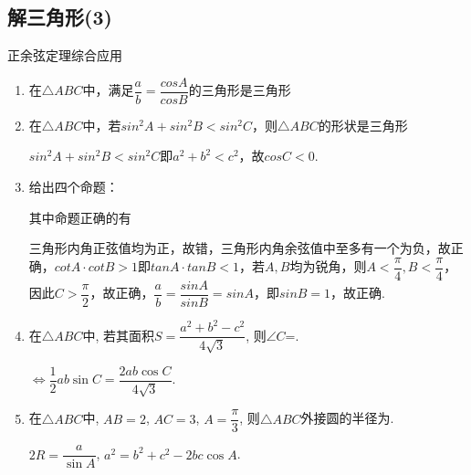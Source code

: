 \subsection{解三角形(3)}
\zsd 正余弦定理综合应用 \\
\begin{enumerate}
    \item 在$\triangle{ABC}$中，满足$\dfrac{a}{b} = \dfrac{cosA}{cosB}$的三角形是三角形
    \item 在$\triangle{ABC}$中，若$sin^2A + sin^2B < sin^2C$，则$\triangle{ABC}$的形状是三角形
    \begin{jieda}
        $sin^2A + sin^2B < sin^2C$即$a^2+b^2 < c^2$，故$cosC < 0$.
    \end{jieda}
    \item 给出四个命题：
    其中命题正确的有
    \begin{jieda}
        三角形内角正弦值均为正，故错，三角形内角余弦值中至多有一个为负，故正确，$cotA \cdot cotB > 1$即$tanA \cdot tanB < 1$，若$A, B$均为锐角，则$A < \dfrac{\pi}{4}, B < \dfrac{\pi}{4}$，因此$C > \dfrac{\pi}{2}$，故正确，$\dfrac{a}{b} = \dfrac{sinA}{sinB} = sinA$，即$sinB = 1$，故正确.
    \end{jieda}
    \item 在$\triangle{ABC}$中, 若其面积$S=\dfrac{a^2+b^2-c^2}{4\sqrt 3}$, 则$\angle{C}$=. 
    \begin{jieda}
    $\iff \dfrac{1}{2}ab\sin{C}=\dfrac{2ab\cos{C}}{4\sqrt{3}}$. 
    \end{jieda}
    
    \item 在$\triangle{ABC}$中, $AB=2$, $AC=3$, $A=\dfrac{\pi}{3}$, 则$\triangle{ABC}$外接圆的半径为. 
    \begin{jieda}
    $2R=\dfrac{a}{\sin{A}}$, $a^2=b^2+c^2-2bc\cos{A}$. 
    \end{jieda}
        

\end{enumerate}
